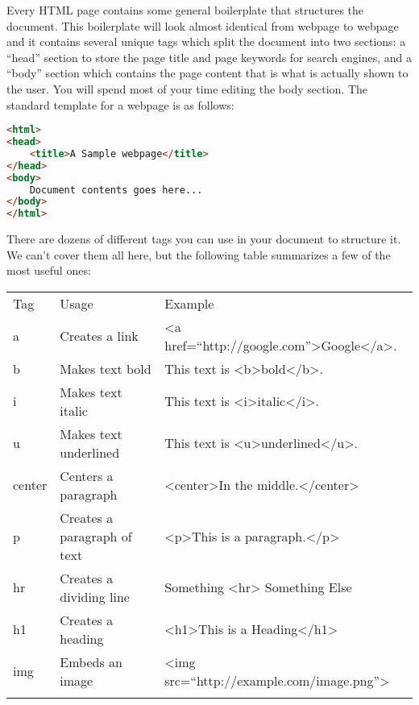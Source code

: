 \documentclass[]{memoir}
\begin{document}
Every HTML page contains some general boilerplate that structures the
document. This boilerplate will look almost identical from webpage to
webpage and it contains several unique tags which split the document
into two sections: a ``head'' section to store the page title and page
keywords for search engines, and a ``body'' section which contains the
page content that is what is actually shown to the user. You will spend
most of your time editing the body section. The standard template for a
webpage is as follows:

\begin{lstlisting}[language=HTML]
<html>
<head>
    <title>A Sample webpage</title>
</head>
<body>
    Document contents goes here...
</body>
</html>
\end{lstlisting}

There are dozens of different tags you can use in your document to
structure it. We can't cover them all here, but the following table
summarizes a few of the most useful ones:

\begin{longtable}[c]{@{}lll@{}}
\hline\noalign{\medskip}
Tag & Usage & Example
\\\noalign{\medskip}
\hline\noalign{\medskip}
a & Creates a link & \textless{}a
href=``http://google.com''\textgreater{}Google\textless{}/a\textgreater{}.
\\\noalign{\medskip}
b & Makes text bold & This text is
\textless{}b\textgreater{}bold\textless{}/b\textgreater{}.
\\\noalign{\medskip}
i & Makes text italic & This text is
\textless{}i\textgreater{}italic\textless{}/i\textgreater{}.
\\\noalign{\medskip}
u & Makes text underlined & This text is
\textless{}u\textgreater{}underlined\textless{}/u\textgreater{}.
\\\noalign{\medskip}
center & Centers a paragraph & \textless{}center\textgreater{}In the
middle.\textless{}/center\textgreater{}
\\\noalign{\medskip}
p & Creates a paragraph of text & \textless{}p\textgreater{}This is a
paragraph.\textless{}/p\textgreater{}
\\\noalign{\medskip}
hr & Creates a dividing line & Something \textless{}hr\textgreater{}
Something Else
\\\noalign{\medskip}
h1 & Creates a heading & \textless{}h1\textgreater{}This is a
Heading\textless{}/h1\textgreater{}
\\\noalign{\medskip}
img & Embeds an image & \textless{}img
src=``http://example.com/image.png''\textgreater{}
\\\noalign{\medskip}
\hline
\end{longtable}
\end{document}
